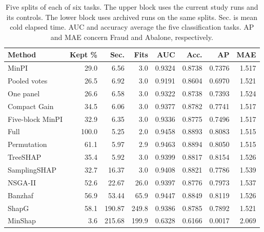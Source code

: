 \begin{table}[tb]
\centering
\caption{Five splits of each of six tasks. The upper block uses the current study runs and its controls. The lower block uses archived runs on the same splits. Sec. is mean cold elapsed time. AUC and accuracy average the five classification tasks. AP and MAE concern Fraud and Abalone, respectively.}
\label{tab:baselines}
\small
\begin{tabular}{@{}lrrrrrrr@{}}
\toprule
Method & Kept \% & Sec. & Fits & AUC & Acc. & AP & MAE \\
\midrule
MinPI & 29.0 & 6.56 & 3.0 & 0.9324 & 0.8738 & 0.7376 & 1.517 \\
Pooled votes & 26.5 & 6.92 & 3.0 & 0.9191 & 0.8604 & 0.6970 & 1.521 \\
One panel & 26.6 & 6.58 & 3.0 & 0.9322 & 0.8738 & 0.7393 & 1.524 \\
Compact Gain & 34.5 & 6.06 & 3.0 & 0.9377 & 0.8782 & 0.7741 & 1.517 \\
Five-block MinPI & 32.9 & 6.35 & 3.0 & 0.9336 & 0.8775 & 0.7496 & 1.517 \\
\midrule
Full & 100.0 & 5.25 & 2.0 & 0.9458 & 0.8893 & 0.8083 & 1.515 \\
Permutation & 61.1 & 5.97 & 2.9 & 0.9463 & 0.8894 & 0.8050 & 1.515 \\
TreeSHAP & 35.4 & 5.92 & 3.0 & 0.9399 & 0.8817 & 0.8154 & 1.526 \\
SamplingSHAP & 32.7 & 16.37 & 3.0 & 0.9408 & 0.8821 & 0.7786 & 1.539 \\
NSGA-II & 52.6 & 22.67 & 26.0 & 0.9397 & 0.8776 & 0.7973 & 1.537 \\
Banzhaf & 56.9 & 53.44 & 65.9 & 0.9447 & 0.8849 & 0.8119 & 1.526 \\
ShapG & 58.1 & 190.87 & 249.8 & 0.9386 & 0.8785 & 0.7892 & 1.521 \\
MinShap & 3.6 & 215.68 & 199.9 & 0.6328 & 0.6166 & 0.0017 & 2.069 \\
\bottomrule
\end{tabular}
\end{table}
